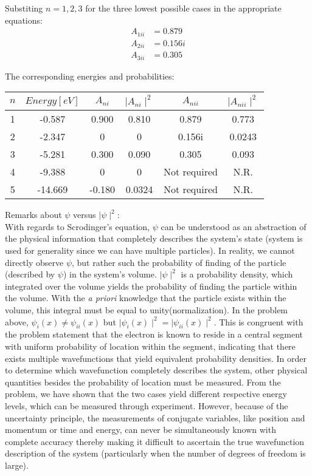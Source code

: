 \documentclass{article}
\numberwithin{equation}{section}
\begin{document}
Substiting $n=1,2,3$ for the three lowest possible cases in the appropriate equations:
\begin{align*}
	A_{1ii}&=0.879
\\	A_{2ii}&=0.156i
\\      A_{3ii}&=0.305
\end{align*}

The corresponding energies and probabilities:
\begin{center}
\begin{tabular}{|c|c|c|c|c|c|}
  \hline
  $n$ & $Energy [eV]$ & $A_{ni}$ & $\mid A_{ni} \mid^2$ & $A_{nii}$& $\mid A_{nii}\mid^2$  \\
  \hline
  1 & -0.587  & 0.900 & 0.810  & 0.879  & 0.773      \\ \hline
  2 & -2.347  & 0     & 0      & 0.156i &  0.0243    \\ \hline
  3 & -5.281  & 0.300 & 0.090  & 0.305  &   0.093    \\ \hline
  4 & -9.388  & 0     & 0      & Not required & N.R. \\ \hline
  5 & -14.669 & -0.180 & 0.0324 & Not required & N.R. \\ \hline
\end{tabular}
\end{center}

Remarks about $\psi$ versus $\mid \psi \mid^2$:
\\
With regards to Scrodinger's equation, $\psi$ can be understood as an abstraction of the physical information that completely describes the system's state (system is used for generality since we can have multiple particles). In reality, we cannot directly observe $\psi$, but rather such the probability of finding of the particle (described by $\psi$) in the system's volume. $\mid \psi \mid^2$ is a probability density, which integrated over the volume yields the probability of finding the particle within the volume. With the \textit {a priori} knowledge that the particle exists within the volume, this integral must be equal to unity(normalization). In the problem above, $\psi_{i}(x)\neq\psi_{ii}(x)$ but $\mid \psi_{i}(x)\mid^2= \mid \psi_{ii}(x)\mid^2$. This is congruent with the problem statement that the electron is known to reside in a central segment with uniform probability of location within the segment, indicating that there exists multiple wavefunctions that yield equivalent probability densities. In order to determine which wavefunction completely describes the system, other physical quantities besides the probability of location must be measured. From the problem, we have shown that the two cases yield different respective energy levels, which can be measured through experiment. However, because of the uncertainty principle, the measurements of conjugate variables, like position and momentum or time and energy, can never be simultaneously known with complete accuracy thereby making it difficult to ascertain the true wavefunction description of the system (particularly when the number of degrees of freedom is large).
\end{document}
